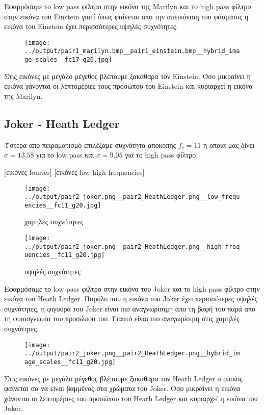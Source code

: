 \documentclass[11pt]{scrartcl} %
\begin{document}
Εφαρμόσαμε το low pass φίλτρο στην εικόνα της Marilyn και το high pass φίλτρο στην εικόνα του Einstein γιατί όπως φαίνεται απο την απεικόνιση του φάσματος η εικόνα του Einstein έχει περισσότερες υψηλές συχνότητες.

\begin{figure}[H]
  \texttt{[image: ../output/pair1\_marilyn.bmp\_\_pair1\_einstein.bmp\_\_hybrid\_image\_scales\_\_fc17\_g20.jpg]}
  \caption{}
\end{figure}

Στις εικόνες με μεγάλο μέγεθος βλέπουμε ξακάθαρα τον Einstein. Όσο μικραίνει η εικόνα χάνονται οι λεπτομέριες τους προσώπου του Einstein και κυριαρχεί η εικόνα της Marilyn.

\subsection{Joker - Heath Ledger}

Ύστερα απο πειραματισμό επιλέξαμε συχνότητα αποκοπής $f_c = 11$ η οποία μας δίνει $\sigma = 13.58$ για το low pass και $\sigma = 9.05$ για το high pass φίλτρο.

[εικόνες fourier]
[εικόνες low high frequencies]
\begin{figure}[H]
  \begin{minipage}[c]{9cm}
    \texttt{[image: ../output/pair2\_joker.png\_\_pair2\_HeathLedger.png\_\_low\_frequencies\_\_fc11\_g20.jpg]}
    \caption{χαμηλές συχνότητες}
  \end{minipage}
  \begin{minipage}[c]{9cm}
    \texttt{[image: ../output/pair2\_joker.png\_\_pair2\_HeathLedger.png\_\_high\_frequencies\_\_fc11\_g20.jpg]}
    \caption{υψηλές συχνότητες}
  \end{minipage}
\end{figure}

Εφαρμόσαμε το low pass φίλτρο στην εικόνα του Joker και το high pass φίλτρο στην εικόνα του Heath Ledger. Παρόλο που η εικόνα του Joker έχει περισσότερες υψηλές συχνότητες, η φιγούρα του Joker είναι πιο αναγνωρίσιμη απο τη βαφή του παρά απο τη φυσιογνωμία του προσώπου του. Γιαυτό είναι πιο αναγωρίσιμη στις χαμηλές συχνότητες.

\begin{figure}[H]
  \texttt{[image: ../output/pair2\_joker.png\_\_pair2\_HeathLedger.png\_\_hybrid\_image\_scales\_\_fc11\_g20.jpg]}
  \caption{}
\end{figure}

Στις εικόνες με μεγάλο μέγεθος βλέπουμε ξακάθαρα τον Heath Ledger ο οποίος φαίνεται σα να είναι βαμμένος στα χρώματα του Joker. Όσο μικραίνει η εικόνα χάνονται οι λεπτομέριες του προσώπου του Heath Ledger και κυριαρχεί η εικόνα του Joker.
\end{document}
